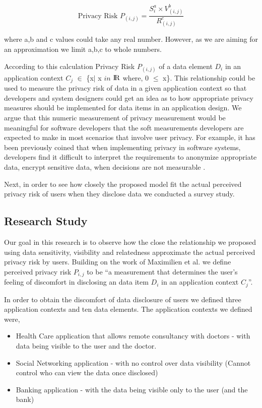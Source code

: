 \documentclass[conference]{IEEEtran}
\begin{document}
\[
\text {Privacy Risk $P_{(i,j)}$} =\frac{S_{i}^a \times V_{(i,j)}^b}{R_{(i,j)}^ c}
\]

where a,b and c values could take any real number. However, as we are aiming for an approximation we limit a,b,c to whole numbers.

According to this calculation Privacy Risk $P_{(i,j)}$  of a data element \textit {$D_i$} in an application context \textit {$C_j$} $\in$ \{x$\mid$ x $in$ ${\rm I\!R}$ where, 0 $\leq$ x\}. This relationship could be used to measure the privacy risk of data in a given application context so that developers and system designers could get an idea as to how appropriate privacy measures should be implemented for data items in an application design. We argue that this numeric measurement of privacy measurement would be meaningful for software developers that the soft measurements developers are expected to make in most scenarios that involve user privacy. For example, it has been previously coined that when implementing privacy in software systems, developers find it difficult to interpret the requirements to anonymize appropriate data, encrypt sensitive data, when decisions are not measurable \cite {senarath2018why}. 



Next, in order to see how closely the proposed model fit the actual perceived privacy risk of users when they disclose data we conducted a survey study.

\subsection {Research Study}

Our goal in this research is to observe how the close the relationship we proposed using data sensitivity, visibility and relatedness approximate the actual perceived privacy risk by users. Building on the work of Maximilien et al. \cite {maximilien2009privacy} we define perceived privacy risk $P_{i,j}$ to be \enquote{a measurement that determines the user's feeling of discomfort in disclosing an data item \textit {$D_i$} in an application context \textit {$C_j$}}. 

In order to obtain the discomfort of data disclosure of users we defined three application contexts and ten data elements. The application contexts we defined were,

\begin{itemize}
\item Health Care application that allows remote consultancy with doctors - with data being visible to the user and the doctor.
\item Social Networking application - with no control over data visibility (Cannot control who can view the data once disclosed)
\item Banking application - with the data being visible only to the user (and the bank)
\end{itemize}
\end{document}
